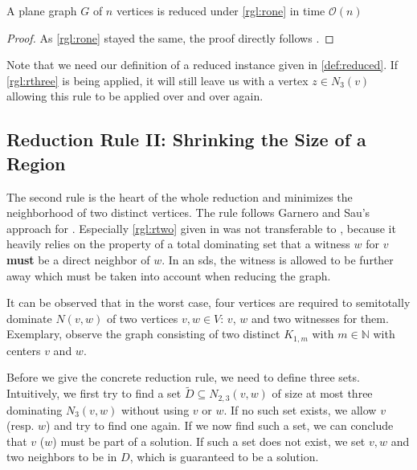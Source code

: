 \begin{lemma}
    A plane graph $G$ of $n$ vertices is reduced under \cref{rgl:rone} in time $\mathcal{O}(n)$
\end{lemma}
\begin{proof}
    As \cref{rgl:rone} stayed the same, the proof directly follows \cite[Lemma 2]{Alber2004}.
\end{proof}

Note that we need our definition of a reduced instance given in \cref{def:reduced}. 
If \cref{rgl:rthree} is being applied, it will still leave us with a vertex $z\in N_3(v)$ allowing this rule to be applied over and over again.
\subsection{Reduction Rule II: Shrinking the Size of a Region}

The second rule is the heart of the whole reduction and minimizes the neighborhood of two distinct vertices. The rule follows Garnero and Sau's approach \cite{Garnero2018} for \ptdom. Especially \cref{rgl:rtwo} given in \cite[arXiv v2]{Garnero2018} was not transferable to \psdom, because it heavily relies on the property of a total dominating set that a witness $w$ for $v$ \textbf{must} be a direct neighbor of $w$. 
In an sds, the witness is allowed to be further away which must be taken into account when reducing the graph.


It can be observed that in the worst case, four vertices are required to semitotally dominate $N(v,w)$ of two vertices $v,w \in V$: $v$, $w$ and two witnesses for them. 
Exemplary, observe the graph consisting of two distinct $K_{1,m}$ with $m \in \mathbb{N}$ with centers $v$ and $w$.

Before we give the concrete reduction rule, we need to define three sets. Intuitively, we first try to find a set $\tilde D \subseteq N_{2,3}(v,w)$ of size at most three dominating $N_3(v,w)$ without using $v$ or $w$. If no such set exists, we allow $v$ (resp. $w$) and try to find one again. 
If we now find such a set, we can conclude that $v$ ($w$) must be part of a solution.
If such a set does not exist, we set $v,w$ and two neighbors to be in $D$, which is guaranteed to be a solution.

